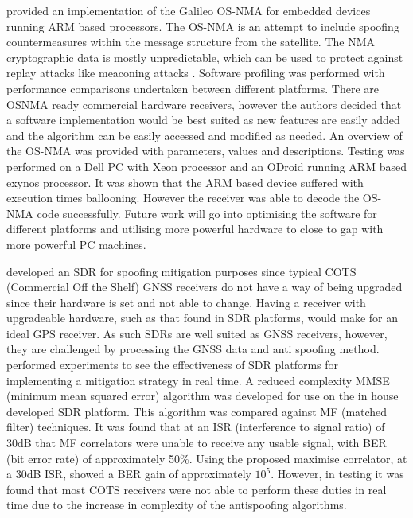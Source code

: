 \textcite{RN36} provided an implementation of the Galileo OS-NMA for embedded devices running ARM based processors. The OS-NMA is an
attempt to include spoofing countermeasures within the message structure from the satellite. The
NMA cryptographic data is mostly unpredictable, which can be used to protect against replay attacks like meaconing attacks \cite{RN37}.
Software profiling was performed with performance comparisons undertaken
between different platforms. There are OSNMA ready commercial hardware receivers, however the authors decided that a software implementation would be best suited as new
features are easily added and the algorithm can be easily accessed and modified as needed. An overview of the OS-NMA was provided with parameters, values and
descriptions. Testing was performed on a Dell PC with Xeon processor and an ODroid running ARM based exynos processor. It was shown that the ARM based device suffered
with execution times ballooning. However the receiver was able to decode the OS-NMA code successfully. Future work will go into optimising the software for different
platforms and utilising more powerful hardware to close to gap with more powerful PC machines.

\textcite{RN18} developed an SDR for spoofing mitigation purposes since typical COTS (Commercial Off the Shelf) GNSS receivers do not have a way of being upgraded since their hardware is set and
not able to change. Having a receiver with upgradeable hardware, such as that found in SDR platforms, would make for an ideal GPS receiver. As such SDRs are well suited
as GNSS receivers, however, they are challenged by processing the GNSS data and anti spoofing method. \citeauthor{RN18} performed experiments to see the effectiveness of SDR
platforms for implementing a mitigation strategy in real time. A reduced complexity MMSE (minimum mean squared error) algorithm was developed for use on the in house
developed SDR platform. This algorithm was compared against MF (matched filter) techniques. It was found that at an ISR (interference to signal ratio) of 30dB that MF
correlators were unable to receive any usable signal, with BER (bit error rate) of approximately 50\%. Using the proposed maximise correlator, at a 30dB ISR, showed a BER
gain of approximately $10^5$. However, in testing it was found that most COTS receivers were not able to perform these duties in real time due to the increase in
complexity of the antispoofing algorithms.

